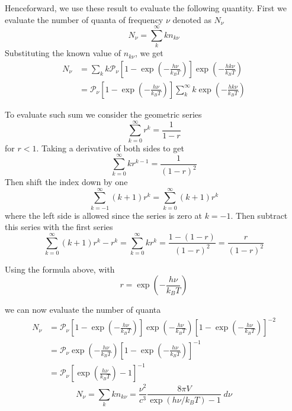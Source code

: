 \documentclass[../../../Main.tex]{subfiles}
\begin{document}
Henceforward, we use these result to evaluate the following quantity. First we evaluate the number of quanta of frequency $\nu$ denoted as $N_\nu$
\begin{equation*}
    N_\nu=\sum_k^{\infty} kn_{k\nu}
\end{equation*}
Substituting the known value of $n_{k\nu}$, we get 
\begin{align*}
    N_\nu&=\sum_k k \mathcal{P}_\nu\left[1-\exp\left(-\frac{h\nu}{k_BT}\right)\right]\exp\left(-\frac{hk\nu}{k_BT}\right)\\
    &=\mathcal{P}_\nu\left[1-\exp\left(-\frac{h\nu}{k_BT}\right)\right] \sum_k^{\infty} k \exp\left(-\frac{hk\nu}{k_BT}\right)
\end{align*}

To evaluate such sum we consider the geometric series
\begin{equation*}
    \sum_{k=0}^{\infty}r^{k}=\frac{1}{1-r}
\end{equation*}
for $r<1$. Taking a derivative of both sides to get
\begin{equation*}
    \sum_{k=0}^{\infty}kr^{k-1}=\frac{1}{(1-r)^2}
\end{equation*}
Then shift the index down by one 
\begin{equation*}
    \sum_{k=-1}^{\infty}(k+1)r^{k}=\sum_{k=0}^{\infty}(k+1)r^{k}
\end{equation*}
where the left side is allowed since the series is zero at $k=-1$. Then subtract this series with the first series
\begin{equation*}
    \sum_{k=0}^{\infty}(k+1)r^{k}-r^k=\sum_{k=0}^{\infty} kr^k=\frac{1-(1-r)}{(1-r)^2}=\frac{r}{(1-r)^2}
\end{equation*}

Using the formula above, with 
\begin{equation*}
    r=\exp\left(-\frac{h\nu}{k_BT}\right)
\end{equation*}

we can now evaluate the number of quanta
\begin{align*}
    N_\nu&=\mathcal{P}_\nu\left[1-\exp\left(-\frac{h\nu}{k_BT}\right) \right]\exp\left(-\frac{h\nu}{k_BT}\right)\left[1-\exp\left(-\frac{h\nu}{k_BT}\right)\right]^{-2}\\
    &=\mathcal{P}_\nu\exp\left(-\frac{h\nu}{k_BT}\right)\left[1-\exp\left(-\frac{h\nu}{k_BT}\right)\right]^{-1}\\
    &=\mathcal{P}_\nu\left[\exp\left(\frac{h\nu}{k_BT}\right)-1 \right]^{-1}
\end{align*}
\begin{equation*}
    N_\nu=\sum_k kn_{k\nu}=\frac{\nu^2}{c^3}\frac{8\pi V}{\exp(h\nu/k_BT)-1}\;d\nu
\end{equation*}
\end{document}
